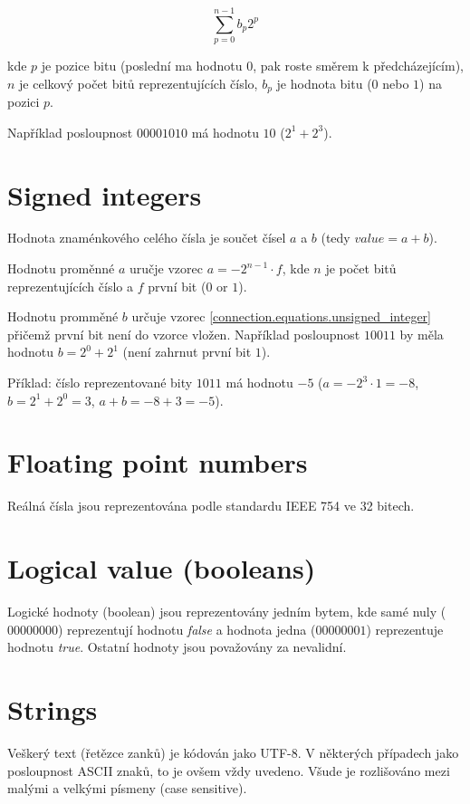 \begin{equation}
\label{connection.equations.unsigned_integer}
\sum_{p = 0}^{n - 1} b_p 2^p
\end{equation}

kde $p$ je pozice bitu (poslední ma hodnotu $0$, pak roste směrem k předcházejícím), $n$ je celkový počet bitů reprezentujících číslo, $b_p$ je hodnota bitu ($0$ nebo $1$) na pozici $p$.

Například posloupnost $00001010$ má hodnotu $10$ ($2^1 + 2^3$).

\section{Signed integers}

Hodnota znaménkového celého čísla je součet čísel $a$ a $b$ (tedy ${value} = a + b$). 

Hodnotu proměnné $a$ uručje vzorec $a = -2^{n - 1} \cdot f$, kde $n$ je počet bitů reprezentujících číslo a $f$ první bit ($0$ or $1$).

Hodnotu promměné $b$ určuje vzorec \ref{connection.equations.unsigned_integer} přičemž první bit není do vzorce vložen. Například posloupnost $10011$ by měla hodnotu $b = 2^0 + 2^1$ (není zahrnut první bit $1$).

Příklad: číslo reprezentované bity $1011$ má hodnotu $-5$ ($a = -2^3 \cdot 1 = -8$, $b = 2^1 + 2^0 = 3$, $a + b = -8 + 3 = -5$).

\section{Floating point numbers}

Reálná čísla jsou reprezentována podle standardu IEEE 754 ve 32 bitech.

\section{Logical value (booleans)} 

Logické hodnoty (boolean) jsou reprezentovány jedním bytem, kde samé nuly ($00000000$) reprezentují hodnotu \emph{false} a hodnota jedna ($00000001$) reprezentuje hodnotu \emph{true}. Ostatní hodnoty jsou považovány za nevalidní.

\section{Strings}

Veškerý text (řetězce zanků) je kódován jako UTF-8. V některých případech jako posloupnost ASCII znaků, to je ovšem vždy uvedeno. Všude je rozlišováno mezi malými a velkými písmeny (case sensitive).